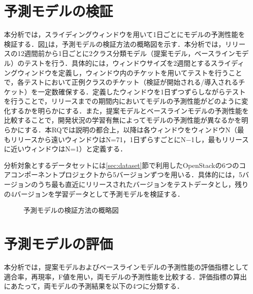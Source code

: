 \documentclass[11pt]{jreport}
\begin{document}
\section{予測モデルの検証}\label{sec:kenshou}
本分析では，スライディングウィンドウを用いて1日ごとにモデルの予測性能を検証する．図\ref{fig:predict_schematic}は，予測モデルの検証方法の概略図を示す．本分析では，リリースの12週間前から1日ごとに2クラス分類モデル（提案モデル，ベースラインモデル）のテストを行う．具体的には，ウィンドウサイズを2週間とするスライディングウィンドウを定義し，ウィンドウ内のチケットを用いてテストを行うことで，各テストにおいて正例クラスのチケット（検証が開始される/導入されるチケット）を一定数確保する．定義したウィンドウを1日ずつずらしながらテストを行うことで，リリースまでの期間内においてモデルの予測性能がどのように変化するかを明らかにする．また，提案モデルとベースラインモデルの予測性能を比較することで，開発状況の学習有無によってモデルの予測性能が異なるかを明らかにする．本RQでは説明の都合上，以降は各ウィンドウをウィンドウN（最もリリースから遠いウィンドウはN=71，1日ずらすごとにN$-$1し，最もリリースに近いウィンドウはN=1）と定義する．

分析対象とするデータセットには\ref{sec:dataset}節で利用したOpenStackの6つのコアコンポーネントプロジェクトから5バージョンずつを用いる．具体的には，5バージョンのうち最も直近にリリースされたバージョンをテストデータとし，残りの4バージョンを学習データとして予測モデルを検証する．

\begin{figure}[t]
\begin{center}
\caption{予測モデルの検証方法の概略図}
\label{fig:predict_schematic}
\end{center}
\end{figure}



\section{予測モデルの評価}\label{sec:hyoka}
本分析では，提案モデルおよびベースラインモデルの予測性能の評価指標として適合率，再現率，F値を用い，両モデルの予測性能を比較する．評価指標の算出にあたって，両モデルの予測結果を以下の4つに分類する．
\end{document}
